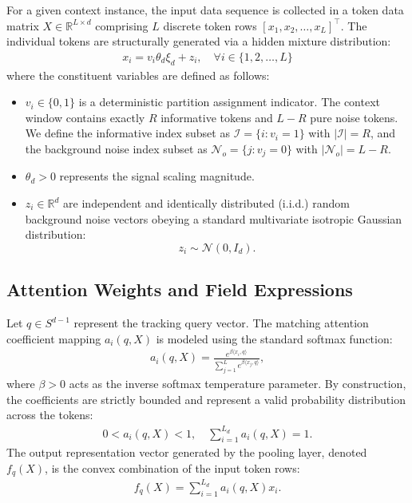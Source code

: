 \documentclass[11pt,a4paper]{article}
\theoremstyle{definition}
\begin{document}
For a given context instance, the input data sequence is collected in a token data matrix $X \in \mathbb{R}^{L \times d}$ comprising $L$ discrete token rows $[x_1, x_2, \dots, x_L]^\top$. The individual tokens are structurally generated via a hidden mixture distribution:
\begin{align}
x_{i} = v_{i}\theta_{d}\xi_{d} + z_{i}, \quad \forall i \in \{1, 2, \dots, L\}
\end{align}
where the constituent variables are defined as follows:
\begin{itemize}
    \item $v_{i} \in \{0,1\}$ is a deterministic partition assignment indicator. The context window contains exactly $R$ informative tokens and $L-R$ pure noise tokens. We define the informative index subset as $\mathcal{I} = \{i : v_i = 1\}$ with $|\mathcal{I}| = R$, and the background noise index subset as $\mathcal{N}_o = \{j : v_j = 0\}$ with $|\mathcal{N}_o| = L - R$.
    \item $\theta_d > 0$ represents the signal scaling magnitude.
    \item $z_{i} \in \mathbb{R}^d$ are independent and identically distributed (i.i.d.) random background noise vectors obeying a standard multivariate isotropic Gaussian distribution:
    \begin{equation}
    z_{i} \sim \mathcal{N}(0, I_{d}).
    \end{equation}
\end{itemize}

\subsection{Attention Weights and Field Expressions}
Let $q \in S^{d-1}$ represent the tracking query vector. The matching attention coefficient mapping $a_{i}(q, X)$ is modeled using the standard softmax function:
\begin{align}
a_{i}(q, X) = \frac{e^{\beta \langle x_{i}, q \rangle}}{\sum_{j=1}^{L} e^{\beta \langle x_{j}, q \rangle}},
\end{align}
where $\beta > 0$ acts as the inverse softmax temperature parameter. By construction, the coefficients are strictly bounded and represent a valid probability distribution across the tokens:
\begin{align}
0 < a_{i}(q, X) < 1, \quad \sum_{i=1}^{L_d} a_{i}(q, X) = 1.
\end{align}
The output representation vector generated by the pooling layer, denoted $f_{q}(X)$, is the convex combination of the input token rows:
\begin{align}
f_{q}(X) = \sum_{i=1}^{L_d} a_{i}(q, X) x_{i}.
\end{align}
\end{document}

